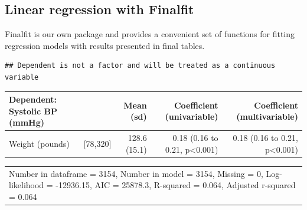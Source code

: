 \documentclass[12pt,]{krantz}
\makeatletter
\newenvironment{Shaded}{\begin{snugshade}}{\end{snugshade}}
\newcommand{\DataTypeTok}[1]{\textcolor[rgb]{0.13,0.29,0.53}{#1}}
\newcommand{\KeywordTok}[1]{\textcolor[rgb]{0.13,0.29,0.53}{\textbf{#1}}}
\newcommand{\NormalTok}[1]{#1}
\newcommand{\OperatorTok}[1]{\textcolor[rgb]{0.81,0.36,0.00}{\textbf{#1}}}
\newcommand{\OtherTok}[1]{\textcolor[rgb]{0.56,0.35,0.01}{#1}}
\newcommand{\StringTok}[1]{\textcolor[rgb]{0.31,0.60,0.02}{#1}}
\newenvironment{kframe}{%
\medskip{}
\setlength{\fboxsep}{.8em}
 \def\at@end@of@kframe{}%
 \ifinner\ifhmode%
  \def\at@end@of@kframe{\end{minipage}}%
  \begin{minipage}{\columnwidth}%
 \fi\fi%
 \def\FrameCommand##1{\hskip\@totalleftmargin \hskip-\fboxsep
 \colorbox{shadecolor}{##1}\hskip-\fboxsep
     \hskip-\linewidth \hskip-\@totalleftmargin \hskip\columnwidth}%
 \MakeFramed {\advance\hsize-\width
   \@totalleftmargin\z@ \linewidth\hsize
   \@setminipage}}%
 {\par\unskip\endMakeFramed%
 \at@end@of@kframe}
\renewenvironment{Shaded}{\begin{kframe}}{\end{kframe}}
\theoremstyle{definition}
\theoremstyle{definition}
\theoremstyle{definition}
\theoremstyle{remark}
\makeatother
\begin{document}
\hypertarget{linear-regression-with-finalfit}{%
\subsection{Linear regression with
Finalfit}\label{linear-regression-with-finalfit}}

Finalfit is our own package and provides a convenient set of functions
for fitting regression models with results presented in final tables.

\begin{Shaded}
\end{Shaded}

\begin{verbatim}
## Dependent is not a factor and will be treated as a continuous variable
\end{verbatim}

\begin{tabular}{llrrr}
\toprule
Dependent: Systolic BP (mmHg) &  & Mean (sd) & Coefficient (univariable) & Coefficient (multivariable)\\
\midrule
Weight (pounds) & [78,320] & 128.6 (15.1) & 0.18 (0.16 to 0.21, p<0.001) & 0.18 (0.16 to 0.21, p<0.001)\\
\bottomrule
\end{tabular}

\begin{tabular}{l}
\toprule
\\
\midrule
Number in dataframe = 3154, Number in model = 3154, Missing = 0, Log-likelihood = -12936.15, AIC = 25878.3, R-squared = 0.064, Adjusted r-squared = 0.064\\
\bottomrule
\end{tabular}

\begin{Shaded}
\end{Shaded}
\end{document}
